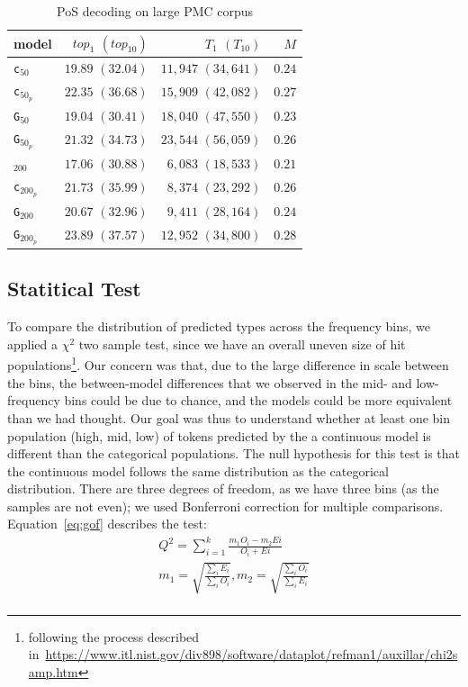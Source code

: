\documentclass[11pt,a4paper]{article}
\begin{document}
\begin{table}[h]
\begin{center}
\begin{tabular}{lrrr}
model &  $top_{1}$ $(top_{10})$ & $T_{1}$ $(T_{10})$ & $M$ \\ \hline
{\tt c}$_{50}$ & $19.89$ $(32.04)$  & $11,947$ $(34,641)$ & $0.24$ \\
{\tt c}$_{50_{p}}$ & $22.35$ $(36.68)$  & $15,909$ $(42,082)$ & $0.27$\\
{\tt G}$_{50}$ & $19.04$ $(30.41)$  & $18,040$ $(47,550)$  & $0.23$\\
{\tt G}$_{50_{p}}$ & $21.32$ $(34.73)$  & $23,544$ $(56,059)$ & $0.26$ \\
\addlinespace[1ex]
{\tt c}$_{200}$ & $17.06$ $(30.88)$ & $6,083$ $(18,533)$ & $0.21$  \\
{\tt c}$_{200_{p}}$ & $21.73$ $(35.99)$ & $8,374$ $(23,292)$ & $0.26$  \\
{\tt G}$_{200}$ & $20.67$ $(32.96)$  & $9,411$ $(28,164)$ & $0.24$\\
{\tt G}$_{200_{p}}$ & $23.89$ $(37.57)$ & $12,952$ $(34,800)$  & $0.28$ \\
\end{tabular}
\end{center}
\vspace{-0.1in}
\caption{\label{pb_dim} PoS decoding on large PMC corpus}
\end{table}


\subsection{Statitical Test}\label{stat}
To compare the distribution of predicted types across the frequency bins, we  applied a $\chi^2$ two sample test, since we have an overall uneven size of hit populations\footnote{following the process described in~\url{https://www.itl.nist.gov/div898/software/dataplot/refman1/auxillar/chi2samp.htm}}.
Our concern was that, due to the large difference in scale between the bins, the between-model differences that we observed in the mid- and low-frequency bins could be due to chance, and the models could be more equivalent than we had thought. Our goal was thus to understand whether at least one bin population (high, mid, low) of tokens predicted by the a continuous model is different than the categorical populations. The null hypothesis for this test is that the continuous model follows the same distribution as the categorical distribution. There are three degrees of freedom, as we have three bins (as the samples are not even); we used Bonferroni correction for multiple comparisons. Equation~\ref{eq:gof} describes the test: 
\begin{equation} \label{eq:gof}
\begin{split}
Q^{2} =  \sum^{k}_{i=1}\frac{m_{1}O_{i}-m_{2}E{i}}{O_{i}+E{i}} \\
m_{1} = \sqrt{\frac{\sum_i E_{i}}{\sum_i O_{i}}}, m_{2} = \sqrt{\frac{\sum_i O_{i}}{\sum_i E_{i}}} \\
\end{split}
\end{equation}
\end{document}
